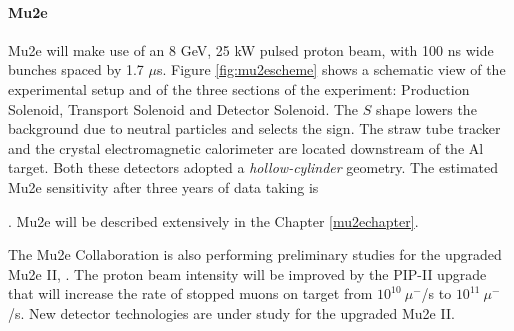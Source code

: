 \paragraph{Mu2e}
Mu2e will make use of an 8 GeV, 
25 kW pulsed proton beam, with 100 
ns wide bunches spaced by 1.7 $\mu$s. 
Figure \ref{fig:mu2escheme} shows a 
schematic view of the experimental setup and of the
three sections of the experiment: 
Production Solenoid, Transport
Solenoid and Detector Solenoid. The 
$S$ shape lowers the background due to 
neutral particles and selects the 
 sign. 
The straw tube tracker and the crystal 
electromagnetic calorimeter are located 
downstream of the Al target. 
Both these detectors adopted a 
\textit{hollow-cylinder} geometry. 
The estimated Mu2e sensitivity after 
three years of data taking is 

\cite{universe9010054}.
Mu2e will be described 
extensively in the Chapter \ref{mu2echapter}.

The Mu2e Collaboration is also 
performing preliminary studies for 
the upgraded  Mu2e II, \cite{dukes}. 
The proton beam intensity will be 
improved by the PIP-II upgrade that 
will increase the rate of stopped muons 
on target from $10^{10} \ \mu^-$/s 
to $10^{11} \ \mu^-$/s. New detector 
technologies are under study for the upgraded
Mu2e II.
